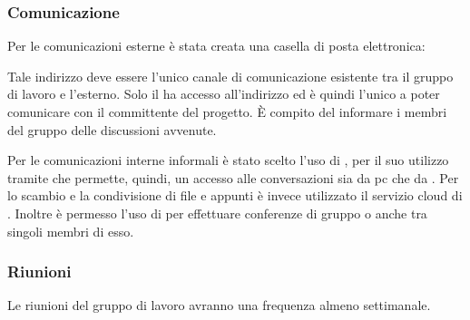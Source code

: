 \documentclass[12pt,a4paper]{article}
\begin{document}
\newpage
\subsubsection{Comunicazione}
Per le comunicazioni esterne è stata creata una casella di posta elettronica:\\
\begin{center}
\href{mailto:\mailGruppo{}}{\mailGruppo{}}
\end{center}
Tale indirizzo deve essere l’unico canale di comunicazione esistente tra il gruppo di lavoro e l’esterno. Solo il \PM{} ha accesso all’indirizzo ed è quindi l’unico a poter comunicare con il committente del progetto. È compito del \PM{} informare i membri del gruppo delle discussioni avvenute.

Per le comunicazioni interne informali è stato scelto l’uso di \textit{}, per il suo utilizzo tramite \textit{} che permette, quindi, un accesso alle conversazioni sia da pc che da \textit{}.
Per lo scambio e la condivisione di file e appunti è invece utilizzato il servizio cloud di \textit{}. Inoltre è permesso l’uso di \textit{} per effettuare conferenze di gruppo o anche tra singoli membri di esso.

\subsubsection{Riunioni}
Le riunioni del gruppo di lavoro avranno una frequenza almeno settimanale.
\end{document}
